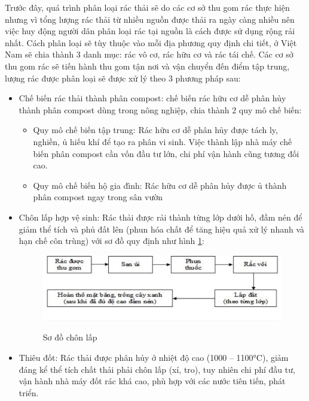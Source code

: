 
Trước đây, quá trình phân loại rác thải sẽ do các cơ sở thu gom rác thực hiện nhưng vì tổng lượng rác thải từ nhiều nguồn được thải ra ngày càng nhiều nên việc huy động người dân phân loại rác tại nguồn là cách được sử dụng rộng rải nhất. Cách phân loại sẽ tùy thuộc vào mỗi địa phương quy định chi tiết, ở Việt Nam sẽ chia thành 3 danh mục: rác vô cơ, rác hữu cơ và rác tái chế. Các cơ sở thu gom rác sẽ tiến hành thu gom tận nơi và vận chuyển đến điểm tập trung, lượng rác được phân loại sẽ được xử lý theo 3 phương pháp sau:
\begin{itemize}
    \item Chế biến rác thải thành phân compost: chế biến rác hữu cơ dễ phân hủy thành phân compost dùng trong nông nghiệp, chia thành 2 quy mô chế biến:
        \begin{itemize}
            \item Quy mô chế biến tập trung: Rác hữu cơ dễ phân hủy được tách ly, nghiền, ủ hiếu khí để tạo ra phân vi sinh. Việc thành lập nhà máy chế biến phân compost cần vốn đầu tư lớn, chi phí vận hành cũng tương đối cao.
            \item  Quy mô chế biến hộ gia đình: Rác hữu cơ dễ phân hủy được ủ thành phân compost ngay trong sân vườn
        \end{itemize}

    \item Chôn lấp hợp vệ sinh: Rác thải được rải thành từng lớp dưới hố, đầm nén để giảm thể tích và phủ đất lên (phun  hóa chất để tăng hiệu quả xử lý nhanh và hạn chế côn trùng) với sơ đồ quy định như hình \ref{fig:so_do_chon_lap}:
    
        \begin{figure}[h]
            \caption{Sơ đồ chôn lấp }
            \includegraphics[width=\textwidth]{images/PhanLoaiRacTruyenThong.png}
            \label{fig:so_do_chon_lap}

        \end{figure}

    \item Thiêu đốt: Rác thải được phân hủy ở nhiệt độ cao (1000 – 1100°C), giảm đáng kể thể tích chất thải phải chôn lấp (xỉ, tro), tuy nhiên chi phí đầu tư, vận hành nhà máy đốt rác khá cao, phù hợp với các nước tiên tiến, phát triển. 
   

\end{itemize}
